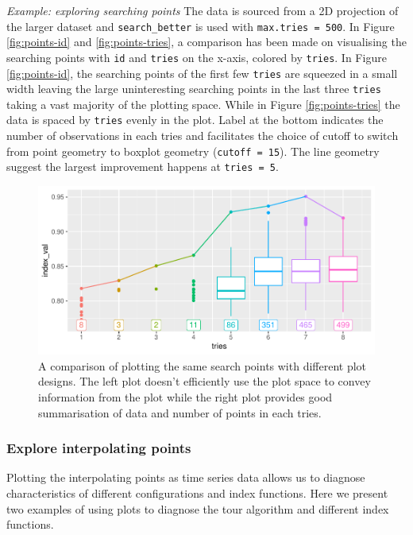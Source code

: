 \documentclass[12pt]{article}
\begin{document}
\emph{Example: exploring searching points} The data is sourced from a 2D
projection of the larger dataset and \texttt{search\_better} is used
with \texttt{max.tries\ =\ 500}. In Figure \ref{fig:points-id} and
\ref{fig:points-tries}, a comparison has been made on visualising the
searching points with \texttt{id} and \texttt{tries} on the x-axis,
colored by \texttt{tries}. In Figure \ref{fig:points-id}, the searching
points of the first few \texttt{tries} are squeezed in a small width
leaving the large uninteresting searching points in the last three
\texttt{tries} taking a vast majority of the plotting space. While in
Figure \ref{fig:points-tries} the data is spaced by \texttt{tries}
evenly in the plot. Label at the bottom indicates the number of
observations in each tries and facilitates the choice of cutoff to
switch from point geometry to boxplot geometry (\texttt{cutoff\ =\ 15}).
The line geometry suggest the largest improvement happens at
\texttt{tries\ =\ 5}.

\begin{figure}
\centering
\includegraphics{paper_files/figure-latex/points-tries-1.pdf}
\caption{\label{points}A comparison of plotting the same search points
with different plot designs. The left plot doesn't efficiently use the
plot space to convey information from the plot while the right plot
provides good summarisation of data and number of points in each tries.}
\end{figure}

\hypertarget{explore-interpolating-points}{%
\subsubsection{Explore interpolating
points}\label{explore-interpolating-points}}

Plotting the interpolating points as time series data allows us to
diagnose characteristics of different configurations and index
functions. Here we present two examples of using plots to diagnose the
tour algorithm and different index functions.
\end{document}
